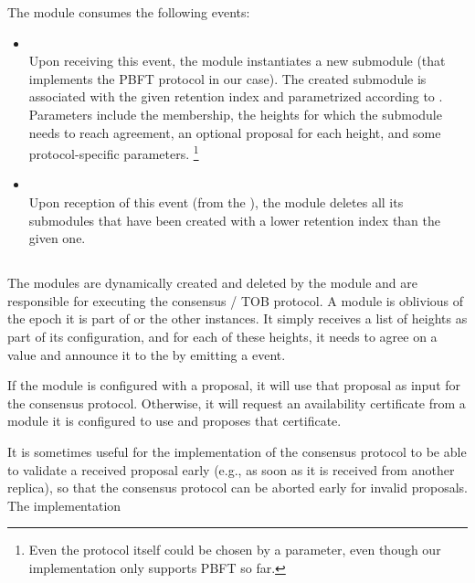 \documentclass{article}
\begin{document}
The  module consumes the following events:

\begin{itemize}

    \item {}\\
    Upon receiving this event, the  module instantiates a new  submodule
    (that implements the PBFT protocol in our case).
    The created submodule is associated with the given retention index and parametrized according to .
    Parameters include the membership, the heights for which the submodule needs to reach agreement,
    an optional proposal for each height, and some protocol-specific parameters.%
    \footnote{Even the protocol itself could be chosen by a parameter, even though our implementation only supports PBFT so far.}

    \item {}\\
    Upon reception of this event (from the ),
    the  module deletes all its submodules that have been created with a lower retention index than the given one.

\end{itemize}

\subsection{}

The  modules are dynamically created and deleted by the  module
and are responsible for executing the consensus / TOB protocol.
A  module is oblivious of the epoch it is part of or the other  instances.
It simply receives a list of heights as part of its configuration,
and for each of these heights, it needs to agree on a value and announce it to the  by emitting a  event.

If the  module is configured with a proposal, it will use that proposal as input for the consensus protocol.
Otherwise, it will request an availability certificate from a  module it is configured to use
and proposes that certificate.

It is sometimes useful for the implementation of the consensus protocol to be able to validate a received proposal early
(e.g., as soon as it is received from another replica), so that the consensus protocol can be aborted early for invalid proposals.
The  implementation
\end{document}
